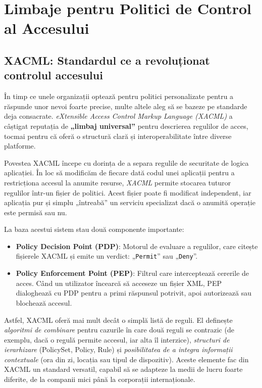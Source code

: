 \documentclass[runningheads]{llncs}
\begin{document}
\section{Limbaje pentru Politici de Control al Accesului}

\subsection{XACML: Standardul ce a revoluționat controlul accesului}
\label{sec:xacml}

În timp ce unele organizații optează pentru politici personalizate pentru a răspunde unor nevoi foarte precise, multe altele aleg să se bazeze pe standarde deja consacrate. \emph{eXtensible Access Control Markup Language (XACML)} a câștigat reputația de \textbf{„limbaj universal”} pentru descrierea regulilor de acces, tocmai pentru că oferă o structură clară și interoperabilitate între diverse platforme.

Povestea XACML începe cu dorința de a separa regulile de securitate de logica aplicației. În loc să modificăm de fiecare dată codul unei aplicații pentru a restricționa accesul la anumite resurse, \emph{XACML} permite stocarea tuturor regulilor într-un fișier de politici. Acest fișier poate fi modificat independent, iar aplicația pur și simplu „întreabă” un serviciu specializat dacă o anumită operație este permisă sau nu.

La baza acestui sistem stau două componente importante:
\begin{itemize}
    \item \textbf{Policy Decision Point (PDP)}: Motorul de evaluare a regulilor, care citește fișierele XACML și emite un verdict: „\texttt{Permit}” sau „\texttt{Deny}”.
    \item \textbf{Policy Enforcement Point (PEP)}: Filtrul care interceptează cererile de acces. Când un utilizator încearcă să acceseze un fișier XML, PEP dialoghează cu PDP pentru a primi răspunsul potrivit, apoi autorizează sau blochează accesul.
\end{itemize}

Astfel, XACML oferă mai mult decât o simplă listă de reguli. El definește \emph{algoritmi de combinare} pentru cazurile în care două reguli se contrazic (de exemplu, dacă o regulă permite accesul, iar alta îl interzice), \emph{structuri de ierarhizare} (PolicySet, Policy, Rule) și \emph{posibilitatea de a integra informații contextuale} (ora din zi, locația sau tipul de dispozitiv). Aceste elemente fac din XACML un standard versatil, capabil să se adapteze la medii de lucru foarte diferite, de la companii mici până la corporații internaționale.
\end{document}
